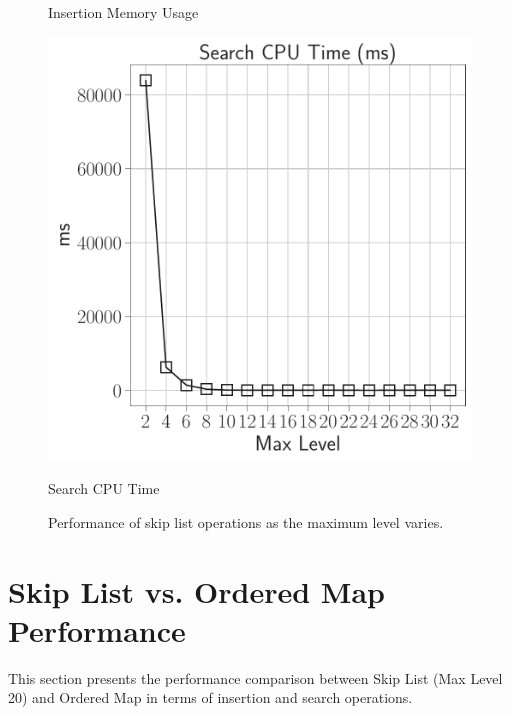 \documentclass{article}
\begin{document}
\begin{figure}[H]
\begin{minipage}{0.32\textwidth}
        \caption*{Insertion Memory Usage}
    \end{minipage}\hfill
    \begin{minipage}{0.32\textwidth}
        \centering
        \includegraphics[width=\linewidth]{../notebook/plot/sl_maxlevel_search_cpu_time_(ms).pdf}
        \caption*{Search CPU Time}
    \end{minipage}
    \caption{Performance of skip list operations as the maximum level varies.}
    \label{fig:skiplist_maxlevel}
\end{figure}

\section{Skip List vs. Ordered Map Performance}

This section presents the performance comparison between Skip List (Max Level 20) and Ordered Map in terms of insertion and search operations.
\end{document}
